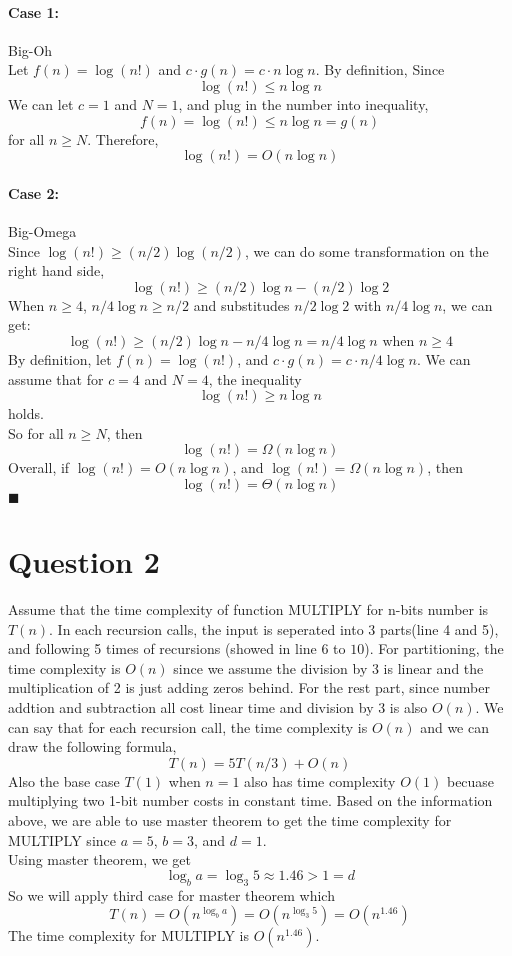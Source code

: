 \documentclass{article}
\begin{document}
    \paragraph{Case 1: } Big-Oh\\
    Let $f(n) = \log(n!)$ and $ c \cdot g(n) = c \cdot n \log n$. By definition, Since
    $$\log(n!) \leq n\log n$$
    We can let $c = 1$ and $N = 1$, and plug in the number into inequality,
    $$f(n) = \log(n!) \leq n\log n = g(n)$$
    for all $n \geq N$. Therefore,
    $$\log(n!) = O(n\log n)$$

    \paragraph{Case 2: } Big-Omega\\
    Since $\log(n!) \geq (n/2)\log(n/2)$, we can do some transformation on the right hand side,
    $$\log(n!) \geq (n/2)\log n - (n/2)\log 2$$
    When $n \geq 4$, $n/4 \log n \geq n/2$ and substitudes $n/2 \log 2$ with
    $n/4 \log n$, we can get:
    $$\log(n!) \geq (n/2)\log n - n/4\log n = n/4\log n \mbox{ when } n \geq 4$$
    By definition, let $f(n) = \log(n!)$, and $c \cdot g(n) = c \cdot n/4 \log n $.
    We can assume that for $c = 4$ and $N = 4$, the inequality 
    $$\log(n!) \geq n\log n$$
    holds.\\
    So for all $n \geq N$, then 
    $$\log(n!) = \Omega(n\log n)$$
    Overall, if $\log(n!) = O(n\log n)$, and $\log(n!) = \Omega(n\log n)$, then
    $$\log(n!) = \Theta(n \log n)$$
    $\blacksquare$








  
\section*{Question 2}
Assume that the time complexity of function MULTIPLY for n-bits number
is $T(n)$. In each recursion calls, the 
input is seperated into 3 parts(line 4 and 5), and following 5 times of recursions
(showed in line $6$ to $10$). For partitioning, the time complexity is $O(n)$ since we assume the division by 3 is linear
and the multiplication of 2 is just adding zeros behind. For the rest part, since number addtion and subtraction
all cost linear time and division by 3 is also $O(n)$. We can say that 
for each recursion call, the time complexity is $O(n)$ and we can draw the following formula,
$$T(n) = 5T(n/3) + O(n)$$
Also the base case $T(1)$ when $n = 1$ also has time complexity $O(1)$ becuase multiplying two 1-bit number costs
in constant time. Based on the information above, we are able to use master
theorem to get the time complexity for MULTIPLY since $a = 5$, $b = 3$, and $d = 1$.\\
Using master theorem, we get
$$\log_b a = \log_3 5 \approx 1.46 > 1 = d$$
So we will apply third case for master theorem which 
$$T(n) = O(n^{\log_b a}) = O(n^{\log_3 5}) = O(n^{1.46})$$
The time complexity for MULTIPLY is $O(n^{1.46})$.
\end{document}
